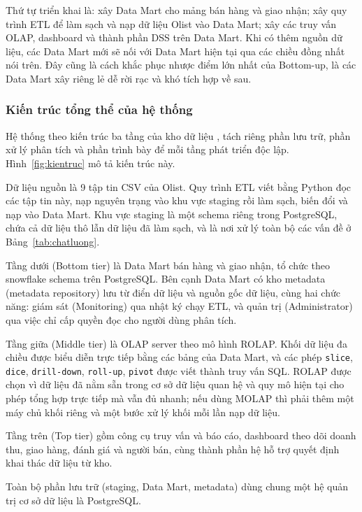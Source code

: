 Thứ tự triển khai là: xây Data Mart cho mảng bán hàng và giao nhận; xây quy trình ETL để làm sạch và nạp dữ liệu Olist vào Data Mart; xây các truy vấn OLAP, dashboard và thành phần DSS trên Data Mart. Khi có thêm nguồn dữ liệu, các Data Mart mới sẽ nối với Data Mart hiện tại qua các chiều đồng nhất nói trên. Đây cũng là cách khắc phục nhược điểm lớn nhất của Bottom-up, là các Data Mart xây riêng lẻ dễ rời rạc và khó tích hợp về sau.

\subsubsection{Kiến trúc tổng thể của hệ thống}\label{sec:kientruc}

Hệ thống theo kiến trúc ba tầng của kho dữ liệu \cite{han}, tách riêng phần lưu trữ, phần xử lý phân tích và phần trình bày để mỗi tầng phát triển độc lập. Hình~\ref{fig:kientruc} mô tả kiến trúc này.



Dữ liệu nguồn là 9 tập tin CSV của Olist. Quy trình ETL viết bằng Python đọc các tập tin này, nạp nguyên trạng vào khu vực staging rồi làm sạch, biến đổi và nạp vào Data Mart. Khu vực staging là một schema riêng trong PostgreSQL, chứa cả dữ liệu thô lẫn dữ liệu đã làm sạch, và là nơi xử lý toàn bộ các vấn đề ở Bảng~\ref{tab:chatluong}.

Tầng dưới (Bottom tier) là Data Mart bán hàng và giao nhận, tổ chức theo snowflake schema trên PostgreSQL. Bên cạnh Data Mart có kho metadata (metadata repository) lưu từ điển dữ liệu và nguồn gốc dữ liệu, cùng hai chức năng: giám sát (Monitoring) qua nhật ký chạy ETL, và quản trị (Administrator) qua việc chỉ cấp quyền đọc cho người dùng phân tích.

Tầng giữa (Middle tier) là OLAP server theo mô hình ROLAP. Khối dữ liệu đa chiều được biểu diễn trực tiếp bằng các bảng của Data Mart, và các phép \texttt{slice}, \texttt{dice}, \texttt{drill-down}, \texttt{roll-up}, \texttt{pivot} được viết thành truy vấn SQL. ROLAP được chọn vì dữ liệu đã nằm sẵn trong cơ sở dữ liệu quan hệ và quy mô hiện tại cho phép tổng hợp trực tiếp mà vẫn đủ nhanh; nếu dùng MOLAP thì phải thêm một máy chủ khối riêng và một bước xử lý khối mỗi lần nạp dữ liệu.

Tầng trên (Top tier) gồm công cụ truy vấn và báo cáo, dashboard theo dõi doanh thu, giao hàng, đánh giá và người bán, cùng thành phần hệ hỗ trợ quyết định khai thác dữ liệu từ kho.

Toàn bộ phần lưu trữ (staging, Data Mart, metadata) dùng chung một hệ quản trị cơ sở dữ liệu là PostgreSQL. 